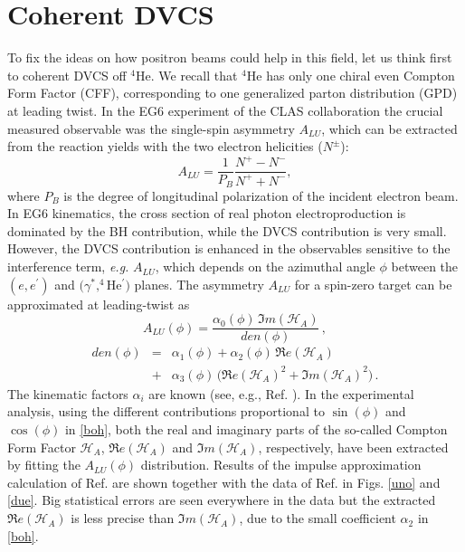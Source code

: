 \documentclass[times, twoside]{PosWhiPap}
\begin{document}
\section*{Coherent DVCS}
To fix the ideas on how positron beams could help in this field, 
let us think first to coherent DVCS off $^4$He.
We recall that $^4$He has only one chiral even Compton Form Factor (CFF), corresponding
to one generalized parton distribution (GPD) at 
   leading twist. In the EG6 experiment of the CLAS collaboration
   \cite{Hattawy:2017woc}
   the crucial measured
observable was the single-spin asymmetry
$A_{LU}$, which can be extracted from the reaction yields with the two electron
helicities ($N^{\pm}$):
\begin{equation}
A_{LU} = \frac{1}{P_{B}} \frac{N^{+} - N^{-}}{N^{+} + N^{-} },
\end{equation}
where $P_{B}$ is the degree of longitudinal polarization of the incident 
electron beam.
 In EG6 kinematics, the cross section of real photon electroproduction is 
   dominated by the BH contribution, while the DVCS contribution is very small.  
   However, the DVCS contribution is enhanced in the observables sensitive to 
   the interference term, {\it e.g.} $A_{LU}$, which depends on the
azimuthal angle $\phi$ between the $(e,e^\prime)$ and 
   $(\gamma^*,^4$He$^\prime)$ planes. The asymmetry $A_{LU}$ for a spin-zero 
   target can be approximated at leading-twist as
\begin{equation}
A_{LU}(\phi) = 
\frac{\alpha_{0}(\phi) \, \Im m(\mathcal{H}_{A})} 
{den(\phi)} \, ,
\end{equation}
\begin{eqnarray}
den(\phi) & = & 
\alpha_{1}(\phi) + \alpha_{2}(\phi) \, \Re e(\mathcal{H}_{A}) 
\nonumber
\\
& + & \alpha_{3}(\phi) \, 
\big( \Re e(\mathcal{H}_{A})^{2} + \Im m(\mathcal{H}_{A})^{2} \big)\, .
\label{boh}
\end{eqnarray}
The kinematic factors $\alpha_i$ are known (see, e.g., Ref.  
\cite{Belitsky:2001ns,Belitsky:2008bz}). 
In the experimental analysis,
using the different contributions proportional to
$\sin(\phi)$ and 
$\cos(\phi)$ in \eqref{boh},  both the real and 
imaginary parts of the so-called Compton Form Factor $\mathcal{H}_{A}$,
$\Re e(\mathcal{H}_{A})$ and $\Im m(\mathcal{H}_{A})$, respectively,
have been extracted by fitting the $A_{LU}(\phi)$ distribution. 
Results of the impulse approximation calculation  
of Ref. \cite{Fucini:2018gso} are shown together with the data 
of Ref. \cite{Hattawy:2017woc} in Figs. \ref{uno} and \ref{due}.
Big statistical errors are seen everywhere in the data but the extracted $\Re 
e(\mathcal{H}_{A})$ is less precise than $\Im m(\mathcal{H}_{A})$, due to the small 
coefficient $\alpha_2$ in \eqref{boh}.
\end{document}

